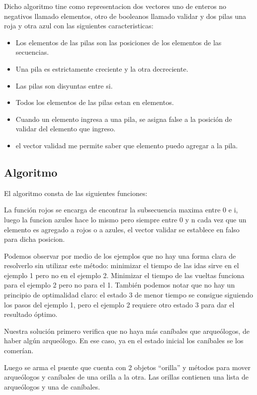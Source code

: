 Dicho  algoritmo tine como representacion dos vectores uno de enteros no negativos llamado elementos, otro de booleanos llamado validar y dos pilas una roja y otra azul con las siguientes caracteristicas:
\begin{itemize}
    \item Los elementos de las pilas son las posiciones de los elementos de las secuencias.
    \item Una pila es estrictamente creciente y la otra decreciente.
    \item Las pilas son disyuntas entre si.
    \item Todos los elementos de las pilas estan en elementos.
    \item Cuando un elemento ingresa a una pila, se asigna false a la posición de validar del elemento que ingreso.
    \item el vector validad me permite saber que elemento puedo agregar a la pila.
\end{itemize}

\subsection{Algoritmo}


El algoritmo consta de las siguientes funciones:

La función rojos se encarga de encontrar la subsecuencia maxima entre 0 e i, luego la funcion azules hace lo mismo pero siempre entre 0 y n
cada vez que un elemento es agregado a rojos o a azules, el vector validar se establece en falso para dicha posicion.



Podemos observar por medio de los ejemplos que no hay una forma clara de resolverlo sin utilizar este método: minimizar el tiempo de las idas sirve en el ejemplo 1 pero no en el ejemplo 2.
Minimizar el tiempo de las vueltas funciona para el ejemplo 2 pero no para el 1.
También podemos notar que no hay un principio de optimalidad claro: el estado 3 de menor tiempo se consigue siguiendo los pasos del ejemplo 1, pero el ejemplo 2 requiere otro estado 3 para dar el resultado óptimo.

\vspace*{5mm}

Nuestra solución primero verifica que no haya más caníbales que arqueólogos, de haber algún arqueólogo.
En ese caso, ya en el estado inicial los caníbales se los comerían.

Luego se arma el puente que cuenta con 2 objetos ``orilla'' y métodos para mover arqueólogos y caníbales de una orilla a la otra. Las orillas contienen una lista de arqueólogos y una de caníbales.

